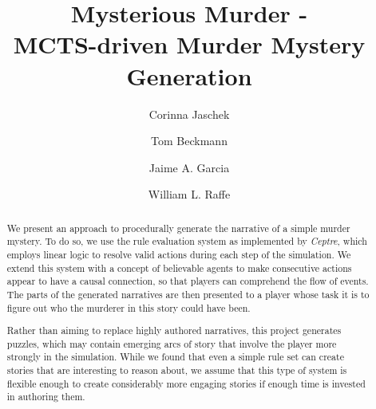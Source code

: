\documentclass[sigchi,review]{acmart}
\begin{document}
\title{Mysterious Murder -\\
MCTS-driven Murder Mystery Generation}

\author{Corinna Jaschek}

\author{Tom Beckmann}

\author{Jaime A. Garcia}

\author{William L. Raffe}

\renewcommand{\shortauthors}{C. Jaschek, T. Beckmann, J. Garcia, W. Raffe}


\begin{abstract}
  We present an approach to procedurally generate the narrative of a simple murder mystery.
  To do so, we use the rule evaluation system as implemented by \emph{Ceptre}, which employs linear logic to resolve valid actions during each step of the simulation.
  We extend this system with a concept of believable agents to make consecutive actions appear to have a causal connection, so that players can comprehend the flow of events.
  The parts of the generated narratives are then presented to a player whose task it is to figure out who the murderer in this story could have been.

  Rather than aiming to replace highly authored narratives, this project generates puzzles, which may contain emerging arcs of story that involve the player more strongly in the simulation.
  While we found that even a simple rule set can create stories that are interesting to reason about, we assume that this type of system is flexible enough to create considerably more engaging stories if enough time is invested in authoring them.
\end{abstract}
\end{document}
